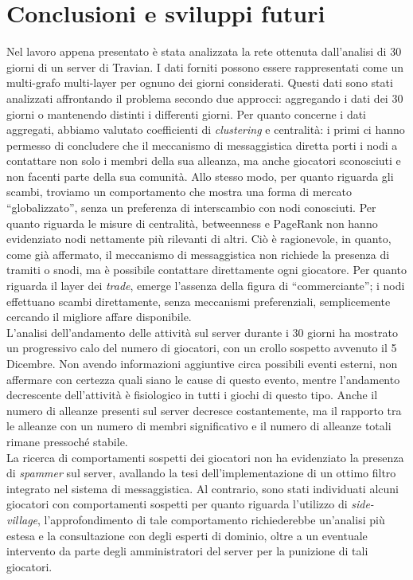 \chapter{Conclusioni e sviluppi futuri}
Nel lavoro appena presentato è stata analizzata la rete ottenuta dall'analisi di 30 giorni di un server di Travian. I dati forniti possono essere rappresentati come un multi-grafo multi-layer per ognuno dei giorni considerati. Questi dati sono stati analizzati affrontando il problema secondo due approcci: aggregando i dati dei 30 giorni o mantenendo distinti i differenti giorni.
Per quanto concerne i dati aggregati, abbiamo valutato coefficienti di \textit{clustering} e centralità: i primi ci hanno permesso di concludere che il meccanismo di messaggistica diretta porti i nodi a contattare non solo i membri della sua alleanza, ma anche giocatori sconosciuti e non facenti parte della sua comunità. Allo stesso modo, per quanto riguarda gli scambi, troviamo un comportamento che mostra una forma di mercato “globalizzato”, senza un preferenza di interscambio con nodi conosciuti.
Per quanto riguarda le misure di centralità, betweenness e PageRank non hanno evidenziato nodi nettamente più rilevanti di altri. Ciò è ragionevole, in quanto, come già affermato, il meccanismo di messaggistica non richiede la presenza di tramiti o snodi, ma è possibile contattare direttamente ogni giocatore. Per quanto riguarda il layer dei \textit{trade}, emerge l'assenza della figura di “commerciante”; i nodi effettuano scambi direttamente, senza meccanismi preferenziali, semplicemente cercando il migliore affare disponibile.\\
L'analisi dell'andamento delle attività sul server durante i 30 giorni ha mostrato un progressivo calo del numero di giocatori, con un crollo sospetto avvenuto il 5 Dicembre. Non avendo informazioni aggiuntive circa possibili eventi esterni, non affermare con certezza quali siano le cause di questo evento, mentre l'andamento decrescente dell'attività è fisiologico in tutti i giochi di questo tipo.
Anche il numero di alleanze presenti sul server decresce costantemente, ma il rapporto tra le alleanze con un numero di membri significativo e il numero di alleanze totali rimane pressoché stabile.\\
La ricerca di comportamenti sospetti dei giocatori non ha evidenziato la presenza di \textit{spammer} sul server, avallando la tesi dell'implementazione di un ottimo filtro integrato nel sistema di messaggistica. Al contrario, sono stati individuati alcuni giocatori con comportamenti sospetti per quanto riguarda l'utilizzo di \textit{side-village}, l'approfondimento di tale comportamento richiederebbe un'analisi più estesa e la consultazione con degli esperti di dominio, oltre a un eventuale intervento da parte degli amministratori del server per la punizione di tali giocatori.\\
